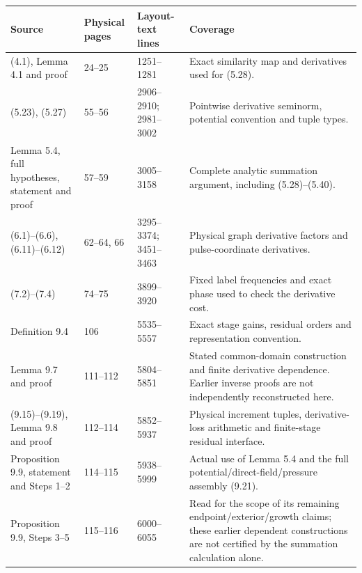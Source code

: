 \documentclass[10pt,a4paper]{article}
\newcounter{none}
\begin{document}
{\def\LTcaptype{none} %
\begin{longtable}[]{@{}
  >{\raggedright\arraybackslash}p{}
  >{\raggedright\arraybackslash}p{}
  >{\raggedright\arraybackslash}p{}
  >{\raggedright\arraybackslash}p{}@{}}
\toprule\noalign{}
\begin{minipage}[b]{\linewidth}\raggedright
Source
\end{minipage} & \begin{minipage}[b]{\linewidth}\raggedright
Physical pages
\end{minipage} & \begin{minipage}[b]{\linewidth}\raggedright
Layout-text lines
\end{minipage} & \begin{minipage}[b]{\linewidth}\raggedright
Coverage
\end{minipage} \\
\midrule\noalign{}
\endhead
\bottomrule\noalign{}
\endlastfoot
(4.1), Lemma 4.1 and proof & {}24--25 & {}1251--1281 & Exact similarity map and derivatives used for (5.28). \\
(5.23), (5.27) & {}55--56 & {}2906--2910; 2981--3002 & Pointwise derivative seminorm, potential convention and tuple types. \\
Lemma 5.4, full hypotheses, statement and proof & {}57--59 & {}3005--3158 & Complete analytic summation argument, including (5.28)--(5.40). \\
(6.1)--(6.6), (6.11)--(6.12) & {}62--64, 66 & {}3295--3374; 3451--3463 & Physical graph derivative factors and pulse-coordinate derivatives. \\
(7.2)--(7.4) & {}74--75 & {}3899--3920 & Fixed label frequencies and exact phase used to check the derivative cost. \\
Definition 9.4 & {}106 & {}5535--5557 & Exact stage gains, residual orders and representation convention. \\
Lemma 9.7 and proof & {}111--112 & {}5804--5851 & Stated common-domain construction and finite derivative dependence. Earlier inverse proofs are not independently reconstructed here. \\
(9.15)--(9.19), Lemma 9.8 and proof & {}112--114 & {}5852--5937 & Physical increment tuples, derivative-loss arithmetic and finite-stage residual interface. \\
Proposition 9.9, statement and Steps 1--2 & {}114--115 & {}5938--5999 & Actual use of Lemma 5.4 and the full potential/direct-field/pressure assembly (9.21). \\
Proposition 9.9, Steps 3--5 & {}115--116 & {}6000--6055 & Read for the scope of its remaining endpoint/exterior/growth claims; these earlier dependent constructions are not certified by the summation calculation alone. \\
\end{longtable}
}
\end{document}
